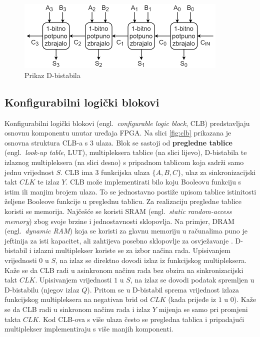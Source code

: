\documentclass[times, utf8, diplomski]{fer}
\begin{document}
\begin{figure}[htb]
	\centering
	\includegraphics[width=0.9\textwidth]{img/ripple_adder.png}
	\caption{Prikaz D-bistabila}
	\label{fig:ripple-adder}
\end{figure}

\subsection{Konfigurabilni logički blokovi} \label{subsec:clb}

Konfigurabilni logički blokovi (engl.~\textit{configurable logic block}, CLB) predstavljaju osnovnu komponentu unutar uređaja FPGA. Na slici \ref{fig:clb} prikazana je osnovna struktura CLB-a s $3$ ulaza. Blok se sastoji od \textbf{pregledne tablice} (engl.~\textit{look-up table}, LUT), multipleksera tablice (na slici lijevo), D-bistabila te izlaznog multipleksera (na slici desno) s pripadnom tablicom koja sadrži samo jednu vrijednost $S$. CLB ima $3$ funkcijska ulaza $\{A, B, C\}$, ulaz za sinkronizacijski takt $CLK$ te izlaz $Y$. CLB može implementirati bilo koju Booleovu funkciju s istim ili manjim brojem ulaza. To se jednostavno postiže upisom tablice istinitosti željene Booleove funkcije u preglednu tablicu. Za realizaciju pregledne tablice koristi se memorija. Najčešće se koristi SRAM (engl.~\textit{static random-access memory}) zbog svoje brzine i jednostavnosti sklopovlja. Na primjer, DRAM (engl.~\textit{dynamic RAM}) koja se koristi za glavnu memoriju u računalima puno je jeftinija za isti kapacitet, ali zahtijeva posebno sklopovlje za osvježavanje \cite{book:memory}. D-bistabil i izlazni multiplekser koriste se za izbor načina rada. Upisivanjem vrijednosti $0$ u $S$, na izlaz se direktno dovodi izlaz iz funkcijskog multipleksera. Kaže se da CLB radi u asinkronom načinu rada bez obzira na sinkronizacijski takt $CLK$. Upisivanjem vrijednosti $1$ u $S$, na izlaz se dovodi podatak spremljen u D-bistabilu (njegov izlaz $Q$). Pritom se u D-bistabil sprema vrijednost izlaza funkcijskog multipleksera na negativan brid od $CLK$ (kada prijeđe iz $1$ u $0$). Kaže se da CLB radi u sinkronom načinu rada i izlaz $Y$ mijenja se samo pri promjeni takta $CLK$. Kod CLB-ova s više ulaza često se pregledna tablica i pripadajući multiplekser implementiraju s više manjih komponenti.
\end{document}
